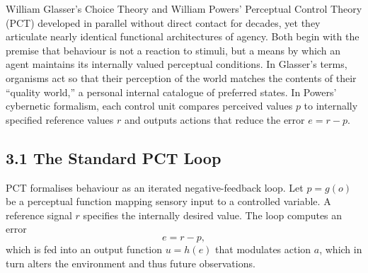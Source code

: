 \documentclass[11pt,a4paper,twoside]{article}
\begin{document}
William Glasser’s Choice Theory \cite{glasser1998choice} and William Powers’ Perceptual Control Theory (PCT)
\cite{powers1973behavior,powers2005behavior}
developed in parallel without direct contact for decades, yet they articulate nearly identical
functional architectures of agency.
Both begin with the premise that behaviour is not a reaction to stimuli,
but a means by which an agent maintains its internally valued perceptual conditions.
In Glasser's terms, organisms act so that their perception of the world matches
the contents of their ``quality world,''
a personal internal catalogue of preferred states.
In Powers’ cybernetic formalism, each control unit compares perceived values $p$
to internally specified reference values $r$ and outputs actions that reduce the error $e = r - p$.

\subsection*{3.1 The Standard PCT Loop}

PCT formalises behaviour as an iterated negative-feedback loop.
Let $p = g(o)$ be a perceptual function mapping sensory input to a controlled variable.
A reference signal $r$ specifies the internally desired value.
The loop computes an error
\[
e = r - p,
\]
which is fed into an output function $u = h(e)$ that modulates action $a$,
which in turn alters the environment and thus future observations.

\vspace{1em}

\begin{center}

\end{center}
\end{document}
